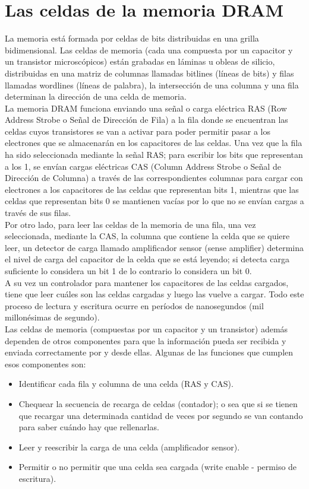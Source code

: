 \documentclass{article}
\begin{document}
\section*{Las celdas de la memoria DRAM}
La memoria está formada por celdas de bits distribuidas en una grilla bidimensional. Las celdas
de memoria (cada una compuesta por un capacitor y un transistor microscópicos) están
grabadas en láminas u obleas de silicio, distribuidas en una matriz de columnas
llamadas bitlines (líneas de bits) y filas llamadas wordlines (líneas de palabra), la intersección
de una columna y una fila determinan la dirección de una celda de memoria.\\[0.1cm]
La memoria DRAM funciona enviando una señal o carga eléctrica RAS (Row Address Strobe o
Señal de Dirección de Fila) a la fila donde se encuentran las celdas cuyos transistores se van a
activar para poder permitir pasar a los electrones que se almacenarán en los capacitores de las
celdas. Una vez que la fila ha sido seleccionada mediante la señal RAS; para escribir los bits que
representan a los 1, se envían cargas eléctricas CAS (Column Address Strobe o Señal de
Dirección de Columna) a través de las correspondientes columnas para cargar con electrones a
los capacitores de las celdas que representan bits 1, mientras que las celdas que representan
bits 0 se mantienen vacías por lo que no se envían cargas a través de sus filas.\\[0.1cm]
Por otro lado, para leer las celdas de la memoria de una fila, una vez seleccionada, mediante la
CAS, la columna que contiene la celda que se quiere leer, un detector de carga
llamado amplificador sensor (sense amplifier) determina el nivel de carga del capacitor de la
celda que se está leyendo; si detecta carga suficiente lo considera un bit 1 de lo contrario lo
considera un bit 0.\\[0.1cm]
A su vez un controlador para mantener los capacitores de las celdas cargados, tiene que leer
cuáles son las celdas cargadas y luego las vuelve a cargar. Todo este proceso de lectura y
escritura ocurre en períodos de nanosegundos (mil millonésimas de segundo).\\[0.1cm]
Las celdas de memoria (compuestas por un capacitor y un transistor) además dependen de
otros componentes para que la información pueda ser recibida y enviada correctamente por y
desde ellas. Algunas de las funciones que cumplen esos componentes son:
\begin{itemize}
\item Identificar cada fila y columna de una celda (RAS y CAS).
\item Chequear la secuencia de recarga de celdas (contador); o sea que si se tienen que
recargar una determinada cantidad de veces por segundo se van contando para saber
cuándo hay que rellenarlas.
\item  Leer y reescribir la carga de una celda (amplificador sensor).
\item Permitir o no permitir que una celda sea cargada (write enable - permiso de escritura).
\end{itemize}
\end{document}
